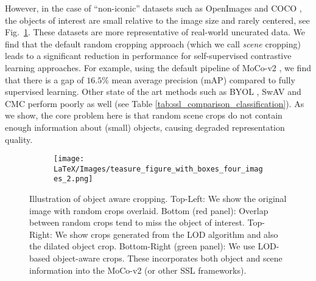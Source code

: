 However, in the case of ``non-iconic'' datasets such as OpenImages \cite{kuznetsova2020open} and COCO \cite{Lin2014MicrosoftCC}, the objects of interest are small relative to the image size and rarely centered, see Fig.~\ref{fig:teaser_figure}. These datasets are more representative of real-world uncurated data. We find that the default random cropping approach (which we call \textit{scene} cropping) leads to a significant reduction in performance for self-supervised contrastive learning approaches. For example, using the default pipeline of MoCo-v2 \cite{chen2020improved}, we find that there is a gap of $16.5\%$ mean average precision (mAP) compared to fully supervised learning. Other state of the art methods such as BYOL \cite{grill2020bootstrap}, SwAV \cite{NEURIPS2020_70feb62b} and CMC \cite{tian2019contrastive} perform poorly as well (see Table \ref{tab:ssl_comparison_classification}). As we show, the core problem here is that random scene crops do not contain enough information about (small) objects, causing degraded representation quality. 
\begin{figure}[t!]
  \centering
  \begin{subfigure}{\linewidth}
    \texttt{[image: LaTeX/Images/teasure\_figure\_with\_boxes\_four\_images\_2.png]}
  \end{subfigure}
  \caption{Illustration of object aware cropping. Top-Left: We show the original image with random crops overlaid. Bottom (red panel): Overlap between random crops tend to miss the object of interest. Top-Right: We show crops generated from the LOD \cite{Vo2021LargeScaleUO} algorithm and also the dilated object crop. Bottom-Right (green panel): We use LOD-based object-aware crops. These incorporates both object and scene information into the MoCo-v2 (or other SSL frameworks).}
  \label{fig:teaser_figure}
  \vspace{-0.1in}
\end{figure}


